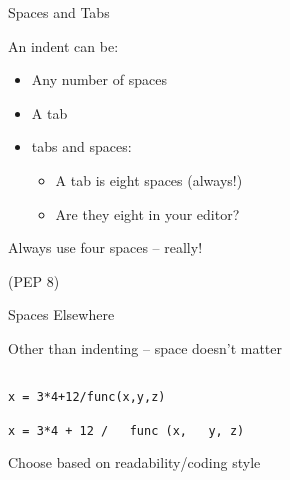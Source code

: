 \documentclass{beamer}
\begin{document}
\begin{frame}[fragile]{Spaces and Tabs}

{\Large  An indent can be:}
\begin{itemize}
  \item Any number of spaces
  \item A tab
  \item tabs and spaces:
    \begin{itemize}
      \item A tab is eight spaces (always!)
      \item Are they eight in your editor?
    \end{itemize}
\end{itemize}

\vfill
{\LARGE Always use four spaces -- really!}

\vfill
(PEP 8)

\end{frame}


\begin{frame}[fragile]{Spaces Elsewhere}

{\Large  Other than indenting -- space doesn't matter}

\vfill
\begin{verbatim}

x = 3*4+12/func(x,y,z)

x = 3*4 + 12 /   func (x,   y, z) 

\end{verbatim}

\vfill
{\Large Choose based on readability/coding style}

\vfill
{}

\end{frame}
\end{document}
